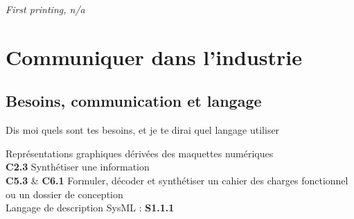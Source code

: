 \documentclass[
	11pt, %
	fleqn, %
	a4paper, %
]{LegrandOrangeBook}
\begin{document}
\noindent \textit{First printing, n/a} %


\pagestyle{empty} %

\tableofcontents %

\listoffigures %

\listoftables %

\pagestyle{fancy} %

\cleardoublepage %


\part{Communiquer dans l'industrie}


\chapterspaceabove{6.75cm} %
\chapterspacebelow{7.25cm} %


\chapter{Besoins, communication et langage}
\og Dis moi quels sont tes besoins, et je te dirai quel langage utiliser \fg
\begin{corollary}[S2.4] 
Représentations graphiques dérivées des maquettes numériques \\
\textbf{C2.3} Synthétiser une information \\
\textbf{C5.3} \& \textbf{C6.1} Formuler, décoder et synthétiser un cahier des charges fonctionnel ou un dossier de conception \\
Langage de description SysML : \textbf{S1.1.1}


\end{corollary}
\end{document}
